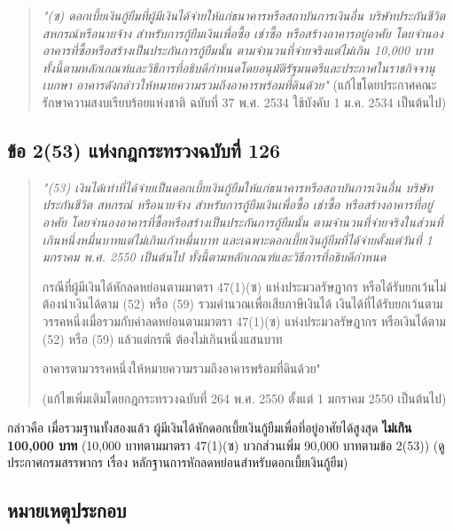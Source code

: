 \documentclass[12pt,a4paper]{article}
\newcommand{\hilight}[1]{\textbf{#1}}
\begin{document}
\begin{quote}
\textit{"(ซ) ดอกเบี้ยเงินกู้ยืมที่ผู้มีเงินได้จ่ายให้แก่ธนาคารหรือสถาบันการเงินอื่น บริษัทประกันชีวิต สหกรณ์หรือนายจ้าง สำหรับการกู้ยืมเงินเพื่อซื้อ เช่าซื้อ หรือสร้างอาคารอยู่อาศัย โดยจำนองอาคารที่ซื้อหรือสร้างเป็นประกันการกู้ยืมนั้น ตามจำนวนที่จ่ายจริงแต่ไม่เกิน 10,000 บาท ทั้งนี้ตามหลักเกณฑ์และวิธีการที่อธิบดีกำหนดโดยอนุมัติรัฐมนตรีและประกาศในราชกิจจานุเบกษา อาคารดังกล่าวให้หมายความรวมถึงอาคารพร้อมที่ดินด้วย"} (แก้ไขโดยประกาศคณะรักษาความสงบเรียบร้อยแห่งชาติ ฉบับที่ 37 พ.ศ. 2534 ใช้บังคับ 1 ม.ค. 2534 เป็นต้นไป)
\end{quote}

\subsection*{ข้อ 2(53) แห่งกฎกระทรวงฉบับที่ 126}

\begin{quote}
{\itshape "(53) เงินได้เท่าที่ได้จ่ายเป็นดอกเบี้ยเงินกู้ยืมให้แก่ธนาคารหรือสถาบันการเงินอื่น บริษัทประกันชีวิต สหกรณ์ หรือนายจ้าง สำหรับการกู้ยืมเงินเพื่อซื้อ เช่าซื้อ หรือสร้างอาคารที่อยู่อาศัย โดยจำนองอาคารที่ซื้อหรือสร้างเป็นประกันการกู้ยืมนั้น ตามจำนวนที่จ่ายจริงในส่วนที่เกินหนึ่งหมื่นบาทแต่ไม่เกินเก้าหมื่นบาท และเฉพาะดอกเบี้ยเงินกู้ยืมที่ได้จ่ายตั้งแต่วันที่ 1 มกราคม พ.ศ. 2550 เป็นต้นไป ทั้งนี้ตามหลักเกณฑ์และวิธีการที่อธิบดีกำหนด

กรณีที่ผู้มีเงินได้หักลดหย่อนตามมาตรา 47(1)(ซ) แห่งประมวลรัษฎากร หรือได้รับยกเว้นไม่ต้องนำเงินได้ตาม (52) หรือ (59) รวมคำนวณเพื่อเสียภาษีเงินได้ เงินได้ที่ได้รับยกเว้นตามวรรคหนึ่งเมื่อรวมกับค่าลดหย่อนตามมาตรา 47(1)(ซ) แห่งประมวลรัษฎากร หรือเงินได้ตาม (52) หรือ (59) แล้วแต่กรณี ต้องไม่เกินหนึ่งแสนบาท

อาคารตามวรรคหนึ่งให้หมายความรวมถึงอาคารพร้อมที่ดินด้วย"} (แก้ไขเพิ่มเติมโดยกฎกระทรวงฉบับที่ 264 พ.ศ. 2550 ตั้งแต่ 1 มกราคม 2550 เป็นต้นไป)
\end{quote}

กล่าวคือ เมื่อรวมฐานทั้งสองแล้ว ผู้มีเงินได้หักดอกเบี้ยเงินกู้ยืมเพื่อที่อยู่อาศัยได้สูงสุด \hilight{ไม่เกิน 100,000 บาท} (10,000 บาทตามมาตรา 47(1)(ซ) บวกส่วนเพิ่ม 90,000 บาทตามข้อ 2(53)) (ดูประกาศกรมสรรพากร เรื่อง หลักฐานการหักลดหย่อนสำหรับดอกเบี้ยเงินกู้ยืม)

\subsection*{หมายเหตุประกอบ}
\end{document}
